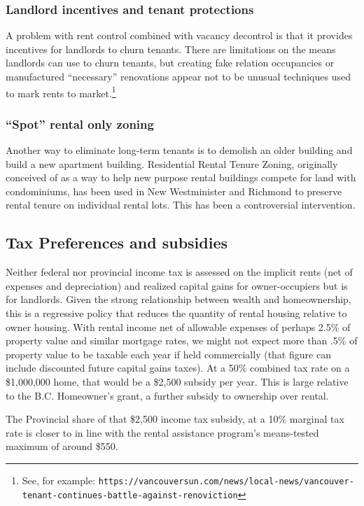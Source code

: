 \documentclass[12pt]{article}
\begin{document}
\subsubsection{Landlord incentives and tenant protections}

A problem with rent control combined with vacancy decontrol is that it provides incentives for landlords to churn tenants. There are limitations on the means landlords can use to churn tenants, but creating fake relation occupancies or manufactured ``necessary'' renovations appear not to be unusual techniques used to mark rents to market.\footnote{See, for example: \texttt{https://vancouversun.com/news/local-news/vancouver-tenant-continues-battle-against-renoviction}}

\subsubsection{``Spot'' rental only zoning}

Another way to eliminate long-term tenants is to demolish an older building and build a new apartment building. Residential Rental Tenure Zoning, originally conceived of as a way to help new purpose rental buildings compete for land with condominiums, has been used in New Westminister and Richmond to preserve rental tenure on individual rental lots. This has been a controversial intervention.

\subsection{Tax Preferences and subsidies}

Neither federal nor provincial income tax is assessed on the implicit rents (net of expenses and depreciation) and realized capital gains for owner-occupiers but is for landlords. Given the strong relationship between wealth and homeownership, this is a regressive policy that reduces the quantity of rental housing relative to owner housing. With rental income net of allowable expenses of perhaps 2.5\% of property value and similar mortgage rates, we might not expect more than .5\% of property value to be taxable each year if held commercially (that figure can include discounted future capital gains taxes). At a 50\% combined tax rate on a \$1,000,000 home, that would be a \$2,500 subsidy per year. This is large relative to the B.C. Homeowner's grant, a further subsidy to ownership over rental.

The Provincial share of that \$2,500 income tax subsidy, at a 10\% marginal tax
rate is closer to in line with the rental assistance program's means-tested
maximum of around \$550.
\end{document}
